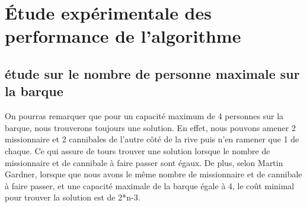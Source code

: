 \documentclass[a4paper, 12pt, french,oneside]{book}
\begin{document}
\chapter{Étude expérimentale des performance de l'algorithme}
\section{étude sur le nombre de personne maximale sur la barque}
On pourras remarquer que pour un capacité maximum de 4 personnes sur la barque, nous trouverons toujours une solution. En effet, nous pouvons amener 2 missionnaire et 2 cannibales de l'autre côté de la rive puis n'en ramener que 1 de chaque. Ce qui assure de tours trouver une solution lorsque le nombre de missionnaire et de cannibale à faire passer sont égaux. De plus, selon Martin Gardner, lorsque que nous avons le même nombre de missionnaire et de cannibale à faire passer, et une capacité maximale de la barque égale à 4, le coût minimal pour trouver la solution est de 2*n-3.
\end{document}
